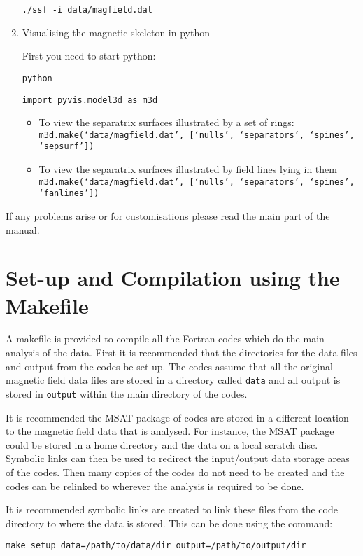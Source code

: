 \documentclass[12pt]{article}
\begin{document}
\begin{enumerate}
      \texttt{./ssf -i data/magfield.dat}

      \item Visualising the magnetic skeleton in python

      First you need to start python:

      \texttt{python}

      \texttt{import pyvis.model3d as m3d}

      \begin{itemize}
        \item To view the separatrix surfaces illustrated by a set of rings:
        \texttt{m3d.make(`data/magfield.dat', [`nulls', `separators', `spines', `sepsurf'])}
        \item To view the separatrix surfaces illustrated by field lines lying in them
        \texttt{m3d.make(`data/magfield.dat', [`nulls', `separators', `spines', `fanlines'])}
      \end{itemize}
    \end{enumerate}
    If any problems arise or for customisations please read the main part of the manual.

  \section{Set-up and Compilation using the Makefile}

    A makefile is provided to compile all the Fortran codes which do the main analysis of the data. First it is recommended that the directories for the data files and output from the codes be set up. The codes assume that all the original magnetic field data files are stored in a directory called \texttt{data} and all output is stored in \texttt{output} within the main directory of the codes.

    It is recommended the MSAT package of codes are stored in a different location to the magnetic field data that is analysed. For instance, the MSAT package could be stored in a home directory and the data on a local scratch disc. Symbolic links can then be used to redirect the input/output data storage areas of the codes. Then many copies of the codes do not need to be created and the codes can be relinked to wherever the analysis is required to be done.

    It is recommended symbolic links are created to link these files from the code directory to where the data is stored. This can be done using the command:

    \texttt{make setup data=/path/to/data/dir output=/path/to/output/dir}
\end{document}
